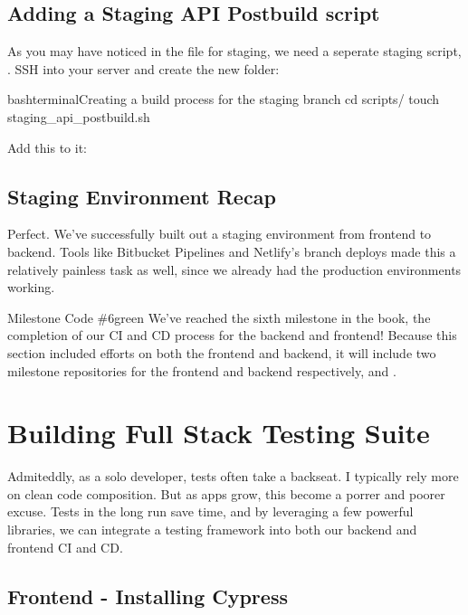 \documentclass[a4paper,headinclude=on,footinclude=on,12pt,oneside]{scrbook}
\begin{document}
\section{Adding a Staging API Postbuild script}

As you may have noticed in the  file for staging, we need a seperate staging script, . SSH into your server and create the new  folder:

\begin{codeInput}{bash}{terminal}{Creating a build process for the staging branch}
cd scripts/
touch staging_api_postbuild.sh
\end{codeInput}

Add this to it:



\section{Staging Environment Recap}

Perfect. We've successfully built out a staging environment from frontend to backend. Tools like Bitbucket Pipelines and Netlify's branch deploys made this a relatively painless task as well, since we already had the production environments working.

\begin{highlightBox}{Milestone Code \#6}{green}{\greenCheck}
We've reached the sixth milestone in the book, the completion of our CI and CD process for the backend and frontend! Because this section included efforts on both the frontend and backend, it will include two milestone repositories for the frontend and backend respectively,  and .
\end{highlightBox}

\chapter{Building Full Stack Testing Suite}

Admiteddly, as a solo developer, tests often take a backseat. I typically rely more on clean code composition. But as apps grow, this become a porrer and poorer excuse. Tests in the long run save time, and by leveraging a few powerful libraries, we can integrate a testing framework into both our backend and frontend CI and CD.

\section{Frontend - Installing Cypress}
\end{document}
